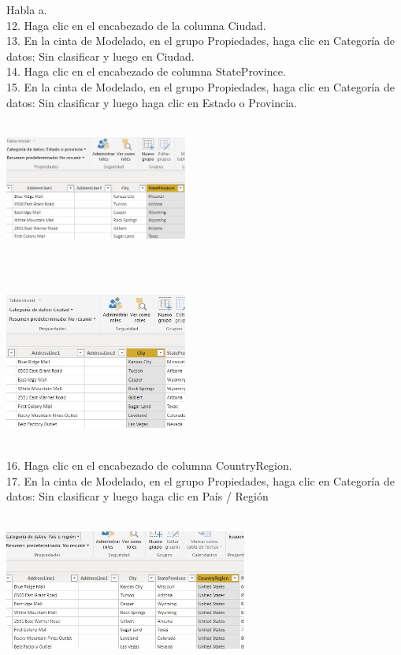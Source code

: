 \begin{flushleft}
\begin{itemize}
Habla a.\\
12. Haga clic en el encabezado de la columna Ciudad.\\
13. En la cinta de Modelado, en el grupo Propiedades, haga clic en Categoría de datos: Sin clasificar y luego en Ciudad.\\
14. Haga clic en el encabezado de columna StateProvince.\\
15. En la cinta de Modelado, en el grupo Propiedades, haga clic en Categoría de datos: Sin clasificar y luego haga clic en Estado o
Provincia.\\
\textbf{ }\\
\begin{center}
	\includegraphics[width=6cm]{./Imagenes/image13} 
	\end{center}
\textbf{ }\\
\textbf{ }\\
\begin{center}
	\includegraphics[width=6cm]{./Imagenes/image14} 
	\end{center}
\textbf{ }\\

16. Haga clic en el encabezado de columna CountryRegion.\\
17. En la cinta de Modelado, en el grupo Propiedades, haga clic en Categoría de datos: Sin clasificar y luego haga clic en
País / Región\\
\textbf{ }\\
\begin{center}
	\includegraphics[width=8cm]{./Imagenes/image15} 
	\end{center}
\textbf{ }\\


\end{itemize}
\end{flushleft}
